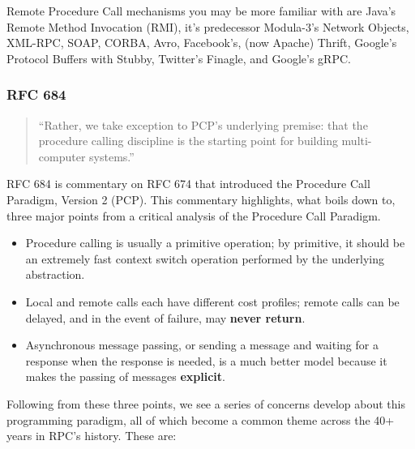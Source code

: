 Remote Procedure Call mechanisms you may be more familiar with are Java's Remote Method Invocation (RMI), it's predecessor Modula-3's Network Objects, XML-RPC, SOAP, CORBA, Avro, Facebook's, (now Apache) Thrift, Google's Protocol Buffers with Stubby, Twitter's Finagle, and Google's gRPC.

\subsubsection{RFC 684}

\begin{quote}
``Rather, we take exception to PCP’s underlying premise: that the procedure calling discipline is the starting point for building multi-computer systems.''	
\end{quote}

RFC 684 is commentary on RFC 674 that introduced the Procedure Call Paradigm, Version 2 (PCP).  This commentary highlights, what boils down to, three major points from a critical analysis of the Procedure Call Paradigm. 

\begin{itemize}
	\item Procedure calling is usually a primitive operation; by primitive, it should be an extremely fast context switch operation performed by the underlying abstraction.
	\item Local and remote calls each have different cost profiles; remote calls can be delayed, and in the event of failure,  may \textbf{never return}.
	\item Asynchronous message passing, or sending a message and waiting for a response when the response is needed, is a much better model because it makes the passing of messages \textbf{explicit}.
\end{itemize}

Following from these three points, we see a series of concerns develop about this programming paradigm, all of which become a common theme across the 40+ years in RPC's history.  These are:

